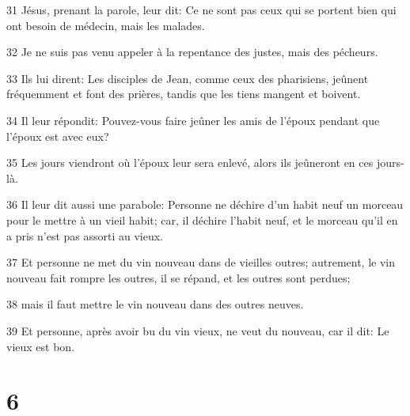 \par 31 Jésus, prenant la parole, leur dit: Ce ne sont pas ceux qui se portent bien qui ont besoin de médecin, mais les malades.
\par 32 Je ne suis pas venu appeler à la repentance des justes, mais des pécheurs.
\par 33 Ils lui dirent: Les disciples de Jean, comme ceux des pharisiens, jeûnent fréquemment et font des prières, tandis que les tiens mangent et boivent.
\par 34 Il leur répondit: Pouvez-vous faire jeûner les amis de l'époux pendant que l'époux est avec eux?
\par 35 Les jours viendront où l'époux leur sera enlevé, alors ils jeûneront en ces jours-là.
\par 36 Il leur dit aussi une parabole: Personne ne déchire d'un habit neuf un morceau pour le mettre à un vieil habit; car, il déchire l'habit neuf, et le morceau qu'il en a pris n'est pas assorti au vieux.
\par 37 Et personne ne met du vin nouveau dans de vieilles outres; autrement, le vin nouveau fait rompre les outres, il se répand, et les outres sont perdues;
\par 38 mais il faut mettre le vin nouveau dans des outres neuves.
\par 39 Et personne, après avoir bu du vin vieux, ne veut du nouveau, car il dit: Le vieux est bon.

\chapter{6}

